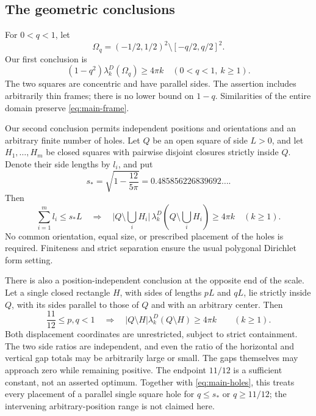 \documentclass[11pt,reqno]{amsart}
\numberwithin{equation}{section}
\newcommand{\abs}[1]{\lvert#1\rvert}
\newcommand{\Om}{\Omega}
\newcommand{\sstar}{s_*}
\begin{document}
\subsection*{The geometric conclusions}

For $0<q<1$, let
\begin{equation}\label{eq:frame}
 \Om_q=(-1/2,1/2)^2\setminus[-q/2,q/2]^2.
\end{equation}
Our first conclusion is
\begin{equation}\label{eq:main-frame}
 \boxed{(1-q^2)\lambda_k^D(\Om_q)\ge4\pi k
       \quad(0<q<1,\ k\ge1).}
\end{equation}
The two squares are concentric and have parallel sides. The assertion
includes arbitrarily thin frames; there is no lower bound on $1-q$.
Similarities of the entire domain preserve \eqref{eq:main-frame}.

Our second conclusion permits independent positions and orientations
and an arbitrary finite number of holes. Let $Q$ be an open square of
side $L>0$, and let $H_1,\ldots,H_m$ be closed squares with pairwise
disjoint closures strictly inside $Q$. Denote their side lengths by
$l_i$, and put
\begin{equation}\label{eq:sharp-constant}
 \sstar=\sqrt{1-\frac{12}{5\pi}}
       =0.485856226839692\ldots.
\end{equation}
Then
\begin{equation}\label{eq:main-holes}
 \sum_{i=1}^m l_i\le\sstar L
 \quad\Longrightarrow\quad
 \abs{Q\setminus\bigcup_iH_i}\,
 \lambda_k^D\left(Q\setminus\bigcup_iH_i\right)\ge4\pi k
 \quad(k\ge1).
\end{equation}
No common orientation, equal size, or prescribed placement of the
holes is required. Finiteness and strict separation ensure the
usual polygonal Dirichlet form setting.

There is also a position-independent conclusion at the opposite
end of the scale. Let a single closed rectangle $H$, with sides
of lengths $pL$ and $qL$, lie strictly inside $Q$, with its sides
parallel to those of $Q$ and with an arbitrary center. Then
\begin{equation}\label{eq:main-displaced}
 \frac{11}{12}\le p,q<1
 \quad\Longrightarrow\quad
 \abs{Q\setminus H}\lambda_k^D(Q\setminus H)\ge4\pi k
 \qquad(k\ge1).
\end{equation}
Both displacement coordinates are unrestricted, subject to strict
containment. The two side ratios are independent, and even the
ratio of the horizontal and vertical gap totals may be arbitrarily
large or small. The gaps themselves may approach zero while
remaining positive. The endpoint $11/12$ is a sufficient
constant, not an asserted optimum. Together with
\eqref{eq:main-holes}, this treats every placement of a parallel
single square hole for $q\le\sstar$ or $q\ge11/12$; the intervening
arbitrary-position range is not claimed here.
\end{document}
